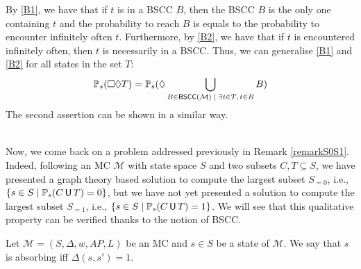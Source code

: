 \begin{proof2}
By \ref{B1}, we have that if $t$ is in a BSCC $B$, then the BSCC $B$ is the only one containing $t$ and the probability to reach $B$ is equals to the probability to encounter infinitely often $t$. Furthermore, by \ref{B2}, we have that if $t$ is encountered infinitely often, then $t$ is necessarily in a BSCC. Thus,
we can generalise \ref{B1} and \ref{B2} for all states in the set $T$:
\[\mathbb{P}_s(\Box \Diamond T) = \mathbb{P}_s(\Diamond \bigcup_{B \in \textnormal{\sffamily BSCC}(\mathcal{M}) \; | \; \exists t \in T, \, t \in B } B)\]
The second assertion can be shown in a similar way.
\end{proof2}\\

Now, we come back on a problem addressed previously in Remark \ref{remarkS0S1}. Indeed, following an MC $\mathcal{M}$ with state space $S$ and two subsets $C, T \subseteq S$, we have presented a graph theory based solution to compute the largest subset $S_{=0}$, i.e., $\{s \in S \; | \; \mathbb{P}_s(C \,\text{\sffamily U}\, T) = 0\}$, but we have not yet presented a solution to compute the largest subset $S_{=1}$, i.e., $\{s \in S \; | \; \mathbb{P}_s(C \,\text{\sffamily U}\, T) = 1\}$.
We will see that this qualitative property can be verified thanks to the notion of BSCC.

\begin{notation}
  Let $\mathcal{M}=(S, \Delta, w, AP, L)$ be an MC and $s \in S$ be a state of $\mathcal{M}$. We say that $s$ is absorbing iff $\Delta(s, s') = 1$.
\end{notation}

